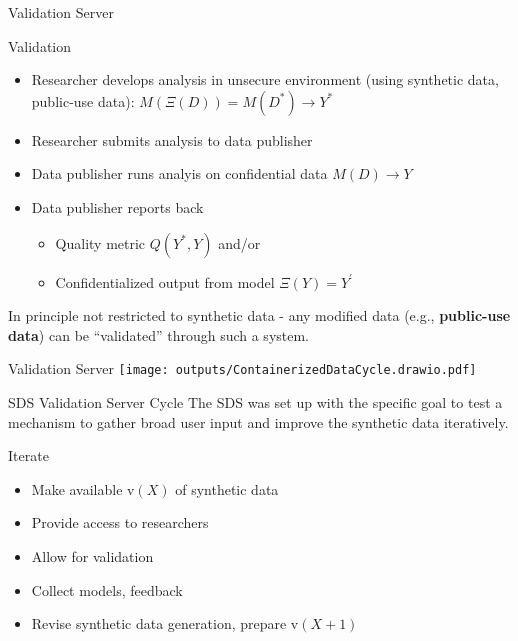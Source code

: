 \begin{frame}{Validation Server}
\begin{block}{Validation}
    \begin{itemize}
        \item Researcher develops analysis in unsecure environment (using synthetic data, public-use data): $M(\Xi(D)) = M(D^*) \rightarrow Y^*$
        \item Researcher submits analysis to data publisher
        \item Data publisher runs analyis on confidential data $M(D) \rightarrow Y $
        \item Data publisher reports back 
        \begin{itemize}
            \item Quality metric $Q(Y^*,Y)$ and/or
            \item Confidentialized output from model $\Xi(Y) = Y^{'}$
        \end{itemize}
    \end{itemize}
\end{block}
    
\footnotesize In principle not restricted to synthetic data - any modified data (e.g., \textbf{public-use data}) can be ``validated'' through such a system. 
\end{frame}



    



\begin{frame}{Validation Server}
\texttt{[image: outputs/ContainerizedDataCycle.drawio.pdf]}
\end{frame}

\begin{frame}{SDS Validation Server Cycle}
The \ac{SDS} was set up with the specific goal to test a mechanism to gather broad user input and improve the synthetic data iteratively.
\begin{block}{Iterate}
\begin{itemize}
    \item Make available v$(X)$ of synthetic data
    \item Provide access to researchers
    \item Allow for validation
    \item Collect models, feedback
    \item Revise synthetic data generation, prepare v$(X+1)$
\end{itemize}
\end{block}
\end{frame}

